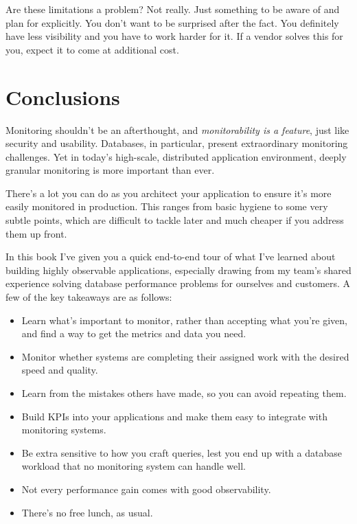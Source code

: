 \documentclass{vivid_layout}
\begin{document}
Are these limitations a problem? Not really. Just something to be aware of and
plan for explicitly. You don't want to be surprised after the fact. You
definitely have less visibility and you have to work harder for it. If a vendor
solves this for you, expect it to come at additional cost.

\section{Conclusions}

Monitoring shouldn't be an afterthought, and \emph{monitorability is a feature},
just like security and usability. Databases, in particular, present
extraordinary monitoring challenges. Yet in today's high-scale, distributed
application environment, deeply granular monitoring is more important than ever.

There's a lot you can do as you architect your application to ensure it's more
easily monitored in production. This ranges from basic hygiene to some very
subtle points, which are difficult to tackle later and much cheaper if you
address them up front.

In this book I've given you a quick end-to-end tour of what I've learned about
building highly observable applications, especially drawing from my team's
shared experience solving database performance problems for ourselves and
customers.  A few of the key takeaways are as follows:

\begin{itemize}
\item Learn what's important to monitor, rather than accepting what you're
given, and find a way to get the metrics and data you need.
\item Monitor whether systems are completing their assigned work with the
desired speed and quality.
\item Learn from the mistakes others have made, so you can avoid repeating them.
\item Build KPIs into your applications and make them easy to integrate with
monitoring systems.
\item Be extra sensitive to how you craft queries, lest you end up with a
database workload that no monitoring system can handle well.
\item Not every performance gain comes with good observability.
\item There's no free lunch, as usual.
\end{itemize}
\end{document}
